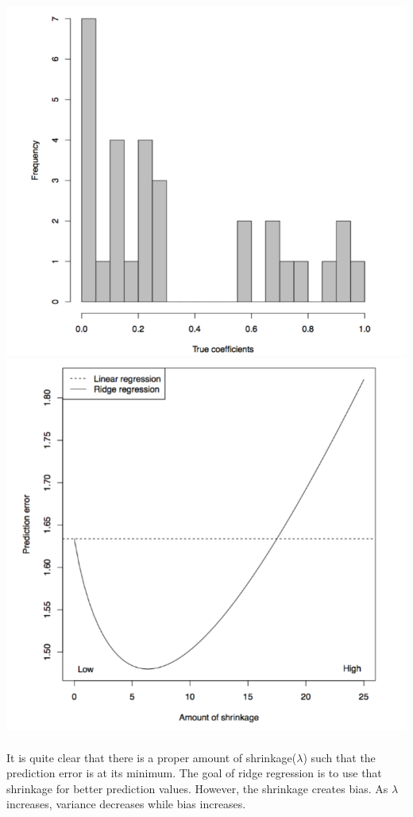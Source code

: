 \documentclass[11pt]{article}
\begin{document}
\includegraphics[scale = 0.4]{Test-Histogram}
\includegraphics[scale = 0.4]{Shrink-to-Predict}
\\ \\
It is quite clear that there is a proper amount of shrinkage($\lambda$) such that the prediction error is at its minimum. The goal of ridge regression is to use that shrinkage for better prediction values. However, the shrinkage creates bias. As $\lambda$ increases, variance decreases while bias increases. 
\end{document}

